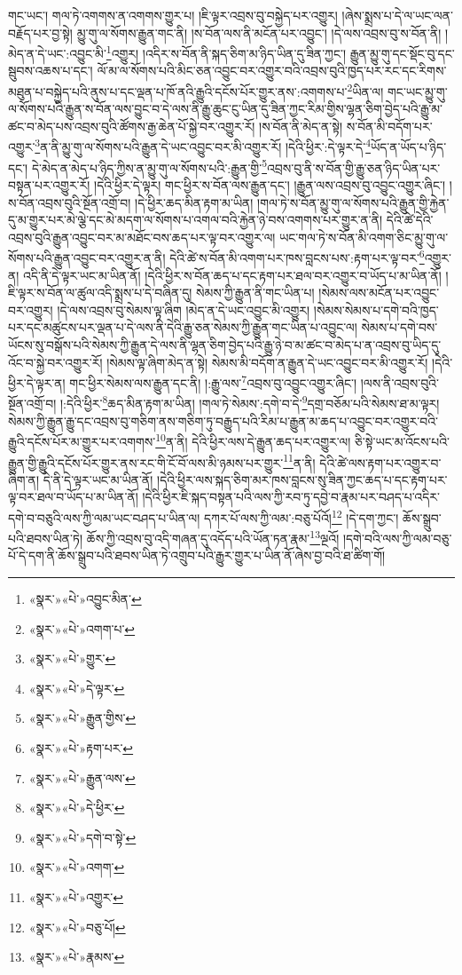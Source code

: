 གང་ཡང་། གལ་ཏེ་འགགས་ན་འགགས་གྱུར་པ། །ཇི་ལྟར་འབྲས་བུ་བསྐྱེད་པར་འགྱུར། །ཞེས་སྨྲས་པ་དེ་ལ་ཡང་ལན་བརྗོད་པར་བྱ་སྟེ། མྱུ་གུ་ལ་སོགས་རྒྱུན་གང་ནི། །ས་བོན་ལས་ནི་མངོན་པར་འབྱུང་། །དེ་ལས་འབྲས་བུ་ས་བོན་ནི། །མེད་ན་དེ་ཡང་:འབྱུང་མི་\footnote{«སྣར་»«པེ་»འབྱུང་མིན་}འགྱུར། །འདིར་ས་བོན་ནི་སྐད་ཅིག་མ་ཉིད་ཡིན་དུ་ཟིན་ཀྱང་། རྒྱུན་མྱུ་གུ་དང་སྡོང་བུ་དང་སྦུབས་འཆས་པ་དང་། ལོ་མ་ལ་སོགས་པའི་མིང་ཅན་འབྱུང་བར་འགྱུར་བའི་འབྲས་བུའི་ཁྱད་པར་རང་དང་རིགས་མཐུན་པ་བསྐྱེད་པའི་ནུས་པ་དང་ལྡན་པ་ཁོ་ནའི་རྒྱུའི་དངོས་པོར་གྱུར་ནས་:འགགས་པ་\footnote{«སྣར་»«པེ་»འགག་པ་}ཡིན་ལ། གང་ཡང་མྱུ་གུ་ལ་སོགས་པའི་རྒྱུན་ས་བོན་ལས་བྱུང་བ་དེ་ལས་ནི་རྒྱུ་ཆུང་ངུ་ཡིན་དུ་ཟིན་ཀྱང་རིམ་གྱིས་ལྷན་ཅིག་བྱེད་པའི་རྒྱུ་མ་ཚང་བ་མེད་པས་འབྲས་བུའི་ཚོགས་རྒྱ་ཆེན་པོ་སྐྱེ་བར་འགྱུར་རོ། །ས་བོན་ནི་མེད་ན་སྟེ། ས་བོན་མི་བདོག་པར་འགྱུར་\footnote{«སྣར་»«པེ་»གྱུར་}ན་ནི་མྱུ་གུ་ལ་སོགས་པའི་རྒྱུན་དེ་ཡང་འབྱུང་བར་མི་འགྱུར་རོ། །དེའི་ཕྱིར་:དེ་ལྟར་དེ་\footnote{«སྣར་»«པེ་»དེ་ལྟར་}ཡོད་ན་ཡོད་པ་ཉིད་དང་། དེ་མེད་ན་མེད་པ་ཉིད་ཀྱིས་ན་མྱུ་གུ་ལ་སོགས་པའི་:རྒྱུན་གྱི་\footnote{«སྣར་»«པེ་»རྒྱུན་གྱིས་}འབྲས་བུ་ནི་ས་བོན་གྱི་རྒྱུ་ཅན་ཉིད་ཡིན་པར་བསྟན་པར་འགྱུར་རོ། །དེའི་ཕྱིར་དེ་ལྟར། གང་ཕྱིར་ས་བོན་ལས་རྒྱུན་དང་། །རྒྱུན་ལས་འབྲས་བུ་འབྱུང་འགྱུར་ཞིང་། །ས་བོན་འབྲས་བུའི་སྔོན་འགྲོ་བ། །དེ་ཕྱིར་ཆད་མིན་རྟག་མ་ཡིན། །གལ་ཏེ་ས་བོན་མྱུ་གུ་ལ་སོགས་པའི་རྒྱུན་གྱི་རྐྱེན་དུ་མ་གྱུར་པར་མེ་ལྕེ་དང་མེ་མདག་ལ་སོགས་པ་འགལ་བའི་རྐྱེན་ཉེ་བས་འགགས་པར་གྱུར་ན་ནི། དེའི་ཚེ་དེའི་འབྲས་བུའི་རྒྱུན་འབྱུང་བར་མ་མཐོང་བས་ཆད་པར་ལྟ་བར་འགྱུར་ལ། ཡང་གལ་ཏེ་ས་བོན་མི་འགག་ཅིང་མྱུ་གུ་ལ་སོགས་པའི་རྒྱུན་འབྱུང་བར་འགྱུར་ན་ནི། དེའི་ཚེ་ས་བོན་མི་འགག་པར་ཁས་བླངས་པས་:རྟག་པར་ལྟ་བར་\footnote{«སྣར་»«པེ་»རྟག་པར་}འགྱུར་ན། འདི་ནི་དེ་ལྟར་ཡང་མ་ཡིན་ནོ། །དེའི་ཕྱིར་ས་བོན་ཆད་པ་དང་རྟག་པར་ཐལ་བར་འགྱུར་བ་ཡོད་པ་མ་ཡིན་ནོ། །ཇི་ལྟར་ས་བོན་ལ་ཚུལ་འདི་སྨྲས་པ་དེ་བཞིན་དུ། སེམས་ཀྱི་རྒྱུན་ནི་གང་ཡིན་པ། །སེམས་ལས་མངོན་པར་འབྱུང་བར་འགྱུར། །དེ་ལས་འབྲས་བུ་སེམས་ལྟ་ཞིག །མེད་ན་དེ་ཡང་འབྱུང་མི་འགྱུར། །སེམས་སེམས་པ་དགེ་བའི་ཁྱད་པར་དང་མཚུངས་པར་ལྡན་པ་དེ་ལས་ནི་དེའི་རྒྱུ་ཅན་སེམས་ཀྱི་རྒྱུན་གང་ཡིན་པ་འབྱུང་ལ། སེམས་པ་དགེ་བས་ཡོངས་སུ་བསྒོས་པའི་སེམས་ཀྱི་རྒྱུན་དེ་ལས་ནི་ལྷན་ཅིག་བྱེད་པའི་རྒྱུ་ཉེ་བ་མ་ཚང་བ་མེད་པ་ན་འབྲས་བུ་ཡིད་དུ་འོང་བ་སྐྱེ་བར་འགྱུར་རོ། །སེམས་ལྟ་ཞིག་མེད་ན་སྟེ། སེམས་མི་བདོག་ན་རྒྱུན་དེ་ཡང་འབྱུང་བར་མི་འགྱུར་རོ། །དེའི་ཕྱིར་དེ་ལྟར་ན། གང་ཕྱིར་སེམས་ལས་རྒྱུན་དང་ནི། །:རྒྱུ་ལས་\footnote{«སྣར་»«པེ་»རྒྱུན་ལས་}འབྲས་བུ་འབྱུང་འགྱུར་ཞིང་། །ལས་ནི་འབྲས་བུའི་སྔོན་འགྲོ་བ། །:དེའི་ཕྱིར་\footnote{«སྣར་»«པེ་»དེ་ཕྱིར་}ཆད་མིན་རྟག་མ་ཡིན། །གལ་ཏེ་སེམས་:དགེ་བ་དེ་\footnote{«སྣར་»«པེ་»དགེ་བ་སྟེ་}དགྲ་བཅོམ་པའི་སེམས་ཐ་མ་ལྟར། སེམས་ཀྱི་རྒྱུན་རྒྱུ་དང་འབྲས་བུ་གཅིག་ནས་གཅིག་ཏུ་བརྒྱུད་པའི་རིམ་པ་རྒྱུན་མ་ཆད་པ་འབྱུང་བར་འགྱུར་བའི་རྒྱུའི་དངོས་པོར་མ་གྱུར་པར་འགགས་\footnote{«སྣར་»«པེ་»འགག་}ན་ནི། དེའི་ཕྱིར་ལས་དེ་རྒྱུན་ཆད་པར་འགྱུར་ལ། ཅི་སྟེ་ཡང་མ་འོངས་པའི་རྒྱུན་གྱི་རྒྱུའི་དངོས་པོར་གྱུར་ནས་རང་གི་ངོ་བོ་ལས་མི་ཉམས་པར་གྱུར་\footnote{«སྣར་»«པེ་»འགྱུར་}ན་ནི། དེའི་ཚེ་ལས་རྟག་པར་འགྱུར་བ་ཞིག་ན། དེ་ནི་དེ་ལྟར་ཡང་མ་ཡིན་ནོ། །དེའི་ཕྱིར་ལས་སྐད་ཅིག་མར་ཁས་བླངས་སུ་ཟིན་ཀྱང་ཆད་པ་དང་རྟག་པར་ལྟ་བར་ཐལ་བ་ཡོད་པ་མ་ཡིན་ནོ། །དེའི་ཕྱིར་ཇི་སྐད་བསྟན་པའི་ལས་ཀྱི་རབ་ཏུ་དབྱེ་བ་རྣམ་པར་བཤད་པ་འདིར་དགེ་བ་བཅུའི་ལས་ཀྱི་ལམ་ཡང་བཤད་པ་ཡིན་ལ། དཀར་པོ་ལས་ཀྱི་ལམ་:བཅུ་པོའོ།\footnote{«སྣར་»«པེ་»བཅུ་པོ།} །དེ་དག་ཀྱང་། ཆོས་སྒྲུབ་པའི་ཐབས་ཡིན་ཏེ། ཆོས་ཀྱི་འབྲས་བུ་འདི་གཞན་དུ་འདོད་པའི་ཡོན་ཏན་རྣམ་\footnote{«སྣར་»«པེ་»རྣམས་}ལྔའོ། །དགེ་བའི་ལས་ཀྱི་ལམ་བཅུ་པོ་དེ་དག་ནི་ཆོས་སྒྲུབ་པའི་ཐབས་ཡིན་ཏེ་འགྲུབ་པའི་རྒྱུར་གྱུར་པ་ཡིན་ནོ་ཞེས་བྱ་བའི་ཐ་ཚིག་གོ། 
